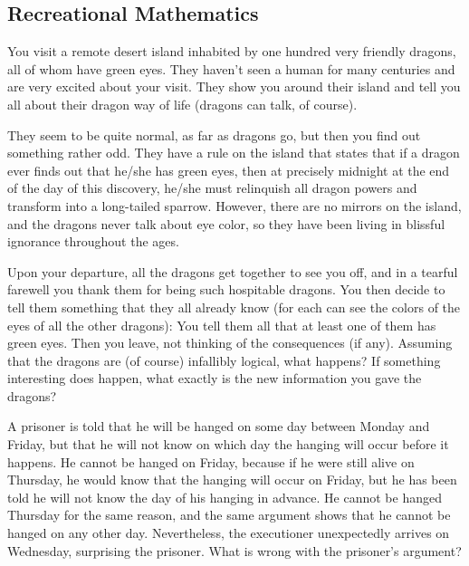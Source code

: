\documentclass[12pt]{article}
\begin{document}
    \subsection{Recreational Mathematics}

    \begin{exercise}
        You visit a remote desert island inhabited by one hundred very friendly dragons, all of whom have green eyes. They haven’t seen a human for many centuries and are very excited about your visit. They show you around their island and tell you all about their dragon way of life (dragons can talk, of course).
    
        They seem to be quite normal, as far as dragons go, but then you find out something rather odd. They have a rule on the island that states that if a dragon ever finds out that he/she has green eyes, then at precisely midnight at the end of the day of this discovery, he/she must relinquish all dragon powers and transform into a long-tailed sparrow. However, there are no mirrors on the island, and the dragons never talk about eye color, so they have been living in blissful ignorance throughout the ages.

        Upon your departure, all the dragons get together to see you off, and in a tearful farewell you thank them for being such hospitable dragons. You then decide to tell them something that they all already know (for each can see the colors of the eyes of all the other dragons): You tell them all that at least one of them has green eyes. Then you leave, not thinking of the consequences (if any). Assuming that the dragons are (of course) infallibly logical, what happens? If something interesting does happen, what exactly is the new information you gave the dragons?
    \end{exercise}
    
    \begin{exercise}
        A prisoner is told that he will be hanged on some day between Monday and Friday, but that he will not know on which day the hanging will occur before it happens. He cannot be hanged on Friday, because if he were still alive on Thursday, he would know that the hanging will occur on Friday, but he has been told he will not know the day of his hanging in advance. He cannot be hanged Thursday for the same reason, and the same argument shows that he cannot be hanged on any other day. Nevertheless, the executioner unexpectedly arrives on Wednesday, surprising the prisoner. What is wrong with the prisoner's argument?
    \end{exercise}
\end{document}
